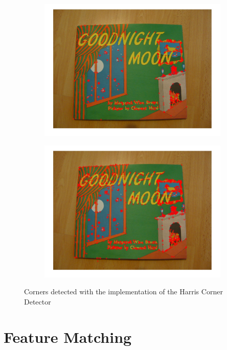 \documentclass{ethz_report}
\begin{document}
\begin{figure}[H]
\centering
\begin{subfigure}[b]{.5\textwidth}
  \centering
  \includegraphics[width=1\linewidth]{images/corners1}
\end{subfigure}%
\begin{subfigure}[b]{.5\textwidth}
  \centering
  \includegraphics[width=1\linewidth]{images/corners2}
\end{subfigure}
\caption{Corners detected with the implementation of the Harris Corner Detector}
\label{img:corners}
\end{figure}

\section{Feature Matching}
\end{document}
